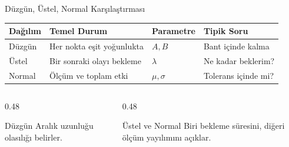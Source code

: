 \documentclass[light]{lutbeamer}
\begin{document}
\begin{frame}{Düzgün, Üstel, Normal Karşılaştırması}
\small
\centering
\begin{tabular}{@{}llll@{}}
    \toprule
    \textbf{Dağılım} & \textbf{Temel Durum} & \textbf{Parametre} & \textbf{Tipik Soru} \\ \midrule
    Düzgün & Her nokta eşit yoğunlukta & $A,B$ & Bant içinde kalma \\
    Üstel & Bir sonraki olayı bekleme & $\lambda$ & Ne kadar beklerim? \\
    Normal & Ölçüm ve toplam etki & $\mu,\sigma$ & Tolerans içinde mi? \\ \bottomrule
\end{tabular}

\vspace{0.25cm}
\begin{columns}[T,onlytextwidth]
    \begin{column}{0.48\textwidth}
        \begin{block}{Düzgün}
            Aralık uzunluğu olasılığı belirler.
        \end{block}
    \end{column}
    \begin{column}{0.48\textwidth}
        \begin{block}{Üstel ve Normal}
            Biri bekleme süresini, diğeri ölçüm yayılımını açıklar.
        \end{block}
    \end{column}
\end{columns}
\end{frame}
\end{document}
